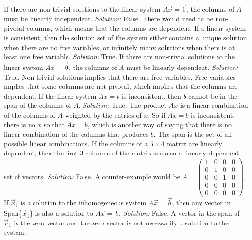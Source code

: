\ifnum {}         
    If there are non-trivial solutions to the linear system $A\vec x = \vec 0$, the columns of $A$ must be linearly independent.
    \ifnum {} {\color{DarkBlue} \textit{Solution:  } False. There would need to be non-pivotal columns, which means that the columns are dependent. } \fi
\fi
\ifnum {}      
    If a linear system is consistent, then the solution set of the system either contains a unique solution when there are no free variables, or infinitely many solutions when there is at least one free variable.         
    \ifnum {} {\color{DarkBlue} \textit{Solution:  } True.  } \fi
\fi    
\ifnum {}  
    If there are non-trivial solutions to the linear system $A\vec x = \vec 0$, the columns of $A$ must be linearly dependent.
    \ifnum {} {\color{DarkBlue} \textit{Solution:  } True. Non-trivial solutions implies that there are free variables. Free variables implies that some columns are not pivotal, which implies that the columns are dependent. } \fi
\fi    
\ifnum {}    
    If the linear system $Ax=b$ is inconsistent, then $b$ cannot be in the span of the columns of $A$.
    \ifnum {} {\color{DarkBlue} \textit{Solution:  } True. The product $Ax$ is a linear combination of the columns of $A$ weighted by the entries of $x$. So if $Ax=b$ is inconsistent, there is no $x$ so that $Ax=b$, which is another way of saying that there is no linear combination of the columns that produces $b$. The span is the set of all possible linear combinations. } \fi
\fi   
\ifnum {}    
    If the columns of a $5\times4$ matrix are linearly dependent, then the first 3 columns of the matrix are also a linearly dependent set of vectors. 
    \ifnum {} {\color{DarkBlue} \textit{Solution:  } False. A counter-example would be \setlength{\extrarowheight}{0.00cm}$A=\begin{pmatrix} 1&0&0&0\\0&1&0&0\\0&0&1&0\\0&0&0&0\\0&0&0&0\end{pmatrix}$. } \fi
\fi    
\ifnum {}      
    If $\vec x_1$ is a solution to the inhomogeneous system $A\vec x = \vec b$, then any vector in Span\{$\vec x_1$\} is also a solution to $A\vec x = \vec b$.
    \ifnum {} {\color{DarkBlue} \textit{Solution:  } False. A vector in the span of $\vec v_1$ is the zero vector and the zero vector is not necessarily a solution to the system. } \fi
\fi           
